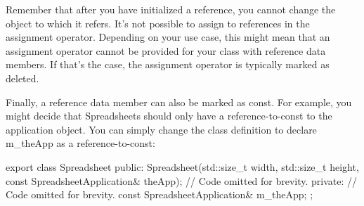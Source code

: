 Remember that after you have initialized a reference, you cannot change the object to which it refers. It’s not possible to assign to references in the assignment operator. Depending on your use case, this might mean that an assignment operator cannot be provided for your class with reference data members. If that’s the case, the assignment operator is typically marked as deleted.

Finally, a reference data member can also be marked as const. For example, you might decide that Spreadsheets should only have a reference-to-const to the application object. You can simply change the class definition to declare m\_theApp as a reference-to-const:

\begin{cpp}
export class Spreadsheet
{
    public:
        Spreadsheet(std::size_t width, std::size_t height,
            const SpreadsheetApplication& theApp);
        // Code omitted for brevity.
    private:
        // Code omitted for brevity.
        const SpreadsheetApplication& m_theApp;
};
\end{cpp}



